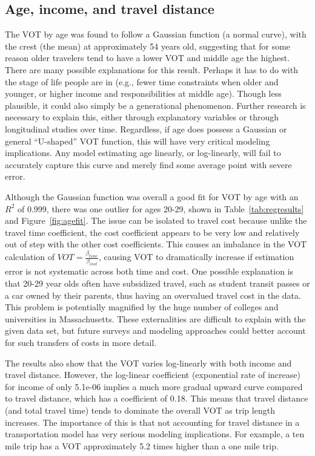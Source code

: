 \documentclass[numbered]{trbunofficial}\usepackage[]{graphicx}\usepackage[]{color}
\begin{document}
\subsection{Age, income, and travel distance}
The VOT by age was found to follow a Gaussian function (a normal curve), with the crest (the mean) at approximately 54 years old, suggesting that for some reason older travelers tend to have a lower VOT and middle age the highest. There are many possible explanations for this result. Perhaps it has to do with the stage of life people are in (e.g., fewer time constraints when older and younger, or higher income and responsibilities at middle age). Though less plausible, it could also simply be a generational phenomenon. Further research is necessary to explain this, either through explanatory variables or through longitudinal studies over time. Regardless, if age does possess a Gaussian or general ``U-shaped'' VOT function, this will have very critical modeling implications. Any model estimating age linearly, or log-linearly, will fail to accurately capture this curve and merely find some average point with severe error.

Although the Gaussian function was overall a good fit for VOT by age with an $R^2$ of  0.999, there was one outlier for ages 20-29, shown in Table~\ref{tab:regresults} and Figure~\ref{fig:agefit}. The issue can be isolated to travel cost because unlike the travel time coefficient, the cost coefficient appears to be very low and relatively out of step with the other cost coefficients. This causes an imbalance in the VOT calculation of $VOT = \frac{\beta_{time}}{\beta_{cost}}$, causing VOT to dramatically increase if estimation error is not systematic across both time and cost. One possible explanation is that 20-29 year olds often have subsidized travel, such as student transit passes or a car owned by their parents, thus having an overvalued travel cost in the data. This problem is potentially magnified by the huge number of colleges and universities in Massachusetts. These externalities are difficult to explain with the given data set, but future surveys and modeling approaches could better account for such transfers of costs in more detail. 

The results also show that the VOT varies log-linearly with both income and travel distance. However, the log-linear coefficient (exponential rate of increase) for income of only 5.1e-06 implies a much more gradual upward curve compared to travel distance, which has a coefficient of 0.18. This means that travel distance (and total travel time) tends to dominate the overall VOT as trip length increases. The importance of this is that not accounting for travel distance in a transportation model has very serious modeling implications. For example, a ten mile trip has a VOT approximately 5.2 times higher than a one mile trip.
\end{document}

